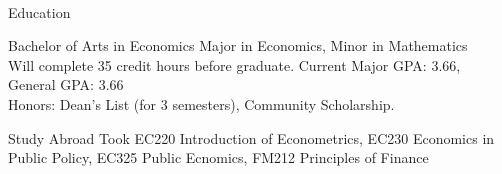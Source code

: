 \documentclass[]{resume-knyte}
\begin{document}



\begin{subheader}{1}
    \\

\end{subheader}

\begin{topic}{Education}


    {Bachelor of Arts in Economics}
    {Major in Economics, Minor in Mathematics\\
    Will complete 35 credit hours before graduate. Current Major GPA: 3.66, General GPA: 3.66\\
    Honors: Dean's List (for 3 semesters), Community Scholarship.}


    {Study Abroad}
    {Took EC220 Introduction of Econometrics, EC230 Economics in Public Policy,
    EC325 Public Ecnomics, FM212 Principles of Finance}

    \\ %
\end{topic}
\end{document}
